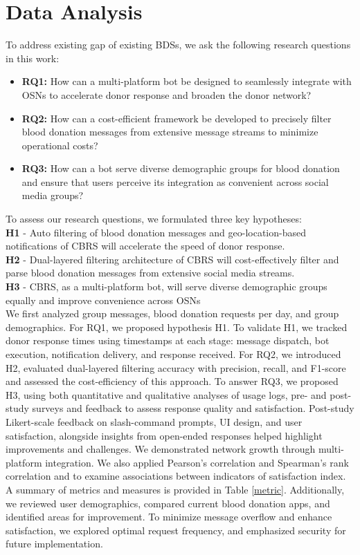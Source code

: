 \documentclass[11pt]{article}
\begin{document}
\section{Data Analysis}\label{appendix:D}
 To address existing gap of existing BDSs, we ask the following research questions in this work:
\begin{itemize}
    \item \textbf{RQ1:} How can a multi-platform bot be designed to seamlessly integrate with OSNs to accelerate donor response and broaden the donor network?
    \item \textbf{RQ2:} How can a cost-efficient framework be developed to precisely filter blood donation messages from extensive message streams to minimize operational costs?
    \item \textbf{RQ3:} How can a bot serve diverse demographic groups for blood donation and ensure that users perceive its integration as convenient across social media groups?\\
\end{itemize}
To assess our research questions, we formulated three key hypotheses:\\
\textbf{H1} - Auto filtering of blood donation messages and geo-location-based notifications of CBRS will accelerate the speed of donor response.\\
\textbf{H2} - Dual-layered filtering architecture of CBRS will cost-effectively filter and parse blood donation messages from extensive social media streams.\\ 
\textbf{H3} - CBRS, as a multi-platform bot, will serve diverse demographic groups equally and improve convenience across OSNs\\
We first analyzed group messages, blood donation requests per day, and group demographics. For RQ1, we proposed hypothesis H1. To validate H1, we tracked donor response times using timestamps at each stage: message dispatch, bot execution, notification delivery, and response received. For RQ2, we introduced H2, evaluated dual-layered filtering accuracy with precision, recall, and F1-score and assessed the cost-efficiency of this approach. To answer RQ3, we proposed H3, using both quantitative and qualitative analyses of usage logs, pre- and post-study surveys and feedback to assess response quality and satisfaction. Post-study Likert-scale feedback on slash-command prompts, UI design, and user satisfaction, alongside insights from open-ended responses helped highlight improvements and challenges. We demonstrated network growth through multi-platform integration. We also applied Pearson’s correlation and Spearman’s rank correlation and to examine associations between indicators of satisfaction index. A summary of metrics and measures is provided in Table \ref{metric}. Additionally, we reviewed user demographics, compared current blood donation apps, and identified areas for improvement. To minimize message overflow and enhance satisfaction, we explored optimal request frequency, and emphasized security for future implementation.
\end{document}
